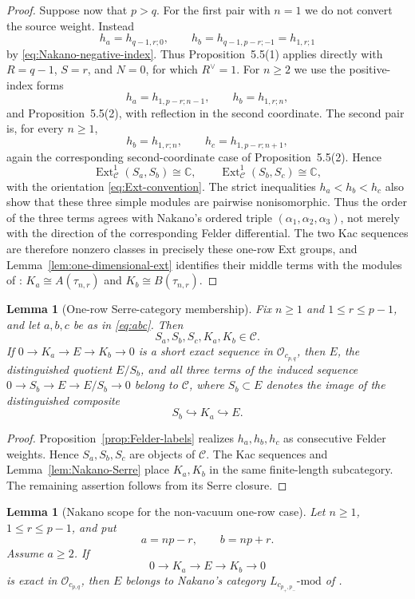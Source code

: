 \documentclass[12pt,leqno]{amsart}
\numberwithin{equation}{section}
\newtheorem{lem}[thm]{Lemma}
\newcommand{\Ext}{\operatorname{Ext}}
\newcommand{\Oc}{\mathcal O}
\def\C{\mathbb{C}}
\begin{document}
\begin{proof}
Suppose now that $p>q$.  For the first pair with $n=1$ we do not convert
the source weight.  Instead
\[
 h_a=h_{q-1,r;0},\qquad
 h_b=h_{q-1,p-r;-1}=h_{1,r;1}
\]
by \eqref{eq:Nakano-negative-index}.  Thus Proposition~5.5(1) applies
directly with $R=q-1$, $S=r$, and $N=0$, for which $R^\vee=1$.  For
$n\ge2$ we use the positive-index forms
\[
 h_a=h_{1,p-r;n-1},\qquad h_b=h_{1,r;n},
\]
and Proposition~5.5(2), with reflection in the second coordinate.  The
second pair is, for every $n\ge1$,
\[
 h_b=h_{1,r;n},\qquad h_c=h_{1,p-r;n+1},
\]
again the corresponding second-coordinate case of Proposition~5.5(2).
Hence
\[
 \Ext^1_{\mathscr C}(S_a,S_b)\cong\C,
 \qquad
 \Ext^1_{\mathscr C}(S_b,S_c)\cong\C,
\]
with the orientation \eqref{eq:Ext-convention}.  The strict inequalities
$h_a<h_b<h_c$ also show that these three simple modules are pairwise
nonisomorphic.  Thus the order of the three terms agrees with Nakano's
ordered triple $(\alpha_1,\alpha_2,\alpha_3)$, not merely with the
direction of the corresponding Felder differential.  The two Kac
sequences are therefore nonzero classes in precisely these one-row Ext
groups, and
Lemma~\ref{lem:one-dimensional-ext} identifies their middle terms with the modules of
\cite[Definition~5.9]{Nakano}:
$K_a\cong A(\tau_{n,r})$ and $K_b\cong B(\tau_{n,r})$.
\end{proof}

\begin{lem}[One-row Serre-category membership]\label{lem:Nakano-membership}
Fix $n\geq1$ and $1\leq r\leq p-1$, and let $a,b,c$ be as in
\eqref{eq:abc}.  Then
\[
 S_a,S_b,S_c,K_a,K_b\in\mathscr C.
\]
If $0\to K_a\to E\to K_b\to0$ is a short exact sequence in
$\Oc_{c_{p,q}}$, then
$E$, the distinguished quotient $E/S_b$, and all three terms of the
induced sequence $0\to S_b\to E\to E/S_b\to0$ belong to
$\mathscr C$, where $S_b\subset E$ denotes the
image of the distinguished composite
\[
 S_b\hookrightarrow K_a\hookrightarrow E.
\]
\end{lem}

\begin{proof}
Proposition~\ref{prop:Felder-labels} realizes $h_a,h_b,h_c$ as consecutive
Felder weights.  Hence $S_a,S_b,S_c$ are objects of $\mathscr C$.  The Kac sequences and
Lemma~\ref{lem:Nakano-Serre} place $K_a,K_b$ in the same finite-length
subcategory.  The remaining assertion follows from its Serre closure.
\end{proof}


\begin{lem}[Nakano scope for the non-vacuum one-row case]
\label{lem:one-row-Nakano-scope}
Let $n\ge1$, $1\le r\le p-1$, and put
\[
 a=np-r,\qquad b=np+r.
\]
Assume $a\ge2$.  If
\begin{equation}\label{eq:one-row-scope-extension}
 0\longrightarrow K_a\longrightarrow E\longrightarrow K_b
 \longrightarrow0
\end{equation}
is exact in $\Oc_{c_{p,q}}$, then $E$ belongs to Nakano's category
$L_{c_{p_+,p_-}}\text{-mod}$ of \cite[Definition~5.1]{Nakano}.
\end{lem}
\end{document}

